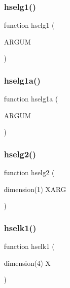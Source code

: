 \mbox{\label{djangoh__h_8f_ac3a86192d187044a13047ea990ad9079}} 
\subsubsection{\texorpdfstring{hselg1()}{hselg1()}}
{\footnotesize\ttfamily function hselg1 (\begin{DoxyParamCaption}\item[{}]{A\+R\+G\+UM }\end{DoxyParamCaption})}

\mbox{\label{djangoh__h_8f_ae3b7e021ca653222e9704c83c1c62d24}} 
\subsubsection{\texorpdfstring{hselg1a()}{hselg1a()}}
{\footnotesize\ttfamily function hselg1a (\begin{DoxyParamCaption}\item[{}]{A\+R\+G\+UM }\end{DoxyParamCaption})}

\mbox{\label{djangoh__h_8f_a31c1778a5988cfebe7a8c9fc65d561cf}} 
\subsubsection{\texorpdfstring{hselg2()}{hselg2()}}
{\footnotesize\ttfamily function hselg2 (\begin{DoxyParamCaption}\item[{dimension(1)}]{X\+A\+RG }\end{DoxyParamCaption})}

\mbox{\label{djangoh__h_8f_a52675b786d943b4b137f55f92362885f}} 
\subsubsection{\texorpdfstring{hselk1()}{hselk1()}}
{\footnotesize\ttfamily function hselk1 (\begin{DoxyParamCaption}\item[{dimension(4)}]{X }\end{DoxyParamCaption})}

